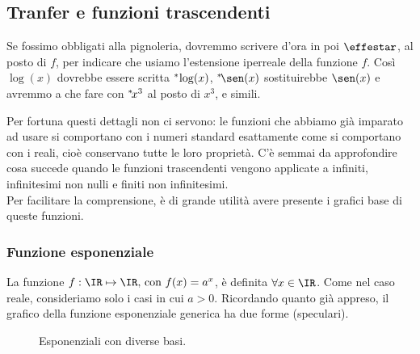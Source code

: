 \subsection{Tranfer e funzioni trascendenti}
\label{subsec:insnum_ftrascendenti}
Se fossimo obbligati alla pignoleria, dovremmo scrivere d'ora in poi 
$\effestar$, al posto di $f$, per indicare che usiamo l'estensione iperreale 
della 
funzione $f$. 
Così $\log(x)$ dovrebbe essere scritta ${}^*\hspace{-.15em}\log(x)$, 
${}^*\hspace{-.15em}\sen(x)$ sostituirebbe $\sen(x)$ e avremmo a che
fare con ${}^*\hspace{-.15em}x^3$ al posto di $x^3$, e simili.

Per fortuna questi dettagli non ci servono: le funzioni che abbiamo già 
imparato ad usare si comportano con i numeri standard esattamente come si 
comportano con i reali, cioè conservano tutte le loro proprietà.
C'è semmai da approfondire cosa succede quando le funzioni trascendenti 
vengono applicate a infiniti, infinitesimi non nulli e finiti non 
infinitesimi.\\
Per facilitare la comprensione, è di grande utilità avere presente i grafici 
base di queste funzioni.

\subsubsection{Funzione esponenziale}
\label{subsubsec:insnum_expstar}
La funzione $f:\IR\mapsto \IR \text{, con } f(x)= a^x$, è definita $\forall x 
\in \IR$.
Come nel caso reale, consideriamo solo i casi in cui $a>0$.  Ricordando 
quanto già appreso, 
il grafico della funzione esponenziale generica ha due forme (speculari). \\

\begin{figure}[h]
\begin{inaccessibleblock}
 \begin{center}
\espdueterzi
 \end{center}
\end{inaccessibleblock}
\caption{Esponenziali con diverse basi.} \label{fig:diversebasi}
\end{figure}
 

